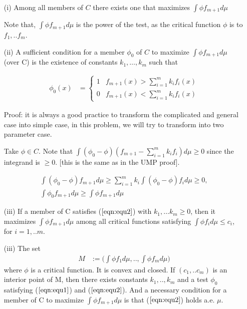 \documentclass[11pt]{article} %
\begin{document}
\begin{itemize}

\item[(i)] Among all members of $C$ there exists one that maximizes $\int \phi f_{m+1} d\mu$

Note that, $\int \phi f_{m+1} d\mu$ is the power of the test, as the critical function $\phi$ is to $f_1,.. f_m$.

\item[(ii)] A sufficient condition for a member $\phi_0$ of $C$ to maximize $\int \phi f_{m+1} d\mu$ (over C) is the existence of constants $k_1, …, k_m$ such that

\begin{align}
	\label{eqn:equ2}
	\phi_0(x) &=  \begin{cases}
	1 & f_{m+1}(x) > \sum_{i=1}^m k_i f_i(x) \\
	0 &  f_{m+1}(x) < \sum_{i=1}^m k_i f_i(x)
	\end{cases}
\end{align}


Proof: it is always a good practice to transform the complicated and general case into simple case, in this problem, we will try to transform into two parameter case.

Take $\phi \in C$. Note that $\int (\phi_0 - \phi) (f_{m+1} - \sum_{i=1}^m k_i f_i) d\mu \geq 0$ since the integrand is $\geq 0$. [this is the same as in the UMP proof].

\begin{align*}
\int (\phi_0 - \phi) f_{m+1} d\mu \geq \sum_{i=1}^m k_i \int (\phi_0- \phi) f_i d\mu \geq 0, \\
\int \phi_0 f_{m+1} d\mu \geq \int \phi f_{m+1} d\mu
\end{align*}

\item[(iii)] If a member of C satisfies ($\ref{eqn:equ2}$) with $k_1, …k_m \geq 0$, then it maximizes $\int \phi f_{m+1} d\mu$ among all critical functions satisfying $\int \phi f_i d\mu \leq c_i$, for $i= 1,..m$.

\item[(iii)] The set 
\begin{align*}
	M &:=\Big ( \int \phi f_1 d\mu, .., \int \phi f_m d\mu \Big) 
\end{align*}
where $\phi$ is a critical function. It is convex and closed. If $(c_1,.. c_m)$ is an interior point of M, then there exists constants $k_1, .., k_m$ and a test $\phi_0$ satisfying ($\ref{eqn:equ1}$) and ($\ref{eqn:equ2}$). And a necessary condition for a member of C to maximize $\int \phi f_{m+1} d\mu$ is that ($\ref{eqn:equ2}$) holds a.e. $\mu$.


\end{itemize}
\end{document}
